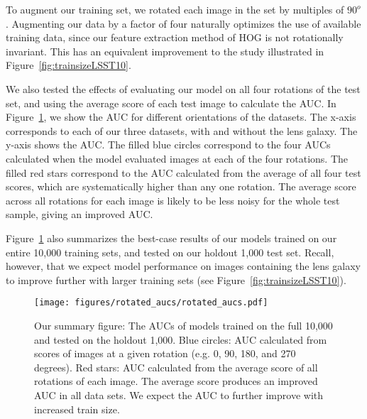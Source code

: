 \documentclass{emulateapj}
\begin{document}
To augment our training set, we rotated each image in the set by
multiples of $90^o$.  Augmenting our data by a factor of four
naturally optimizes the use of available training data, since our
feature extraction method of HOG is not rotationally invariant.  This
has an equivalent improvement to the study illustrated in
Figure~\ref{fig:trainsizeLSST10}.

We also tested the effects of evaluating our model on all four
rotations of the test set, and using the average score of each test
image to calculate the AUC.  In Figure~\ref{fig:rotation_test}, we
show the AUC for different orientations of the datasets.  The x-axis
corresponds to each of our three datasets, with and without the lens
galaxy.  The y-axis shows the AUC.  The filled blue circles correspond
to the four AUCs calculated when the model evaluated images at each of
the four rotations.  The filled red stars correspond to the AUC
calculated from the average of all four test scores, which are
systematically higher than any one rotation.  The average score across
all rotations for each image is likely to be less noisy for the whole
test sample, giving an improved AUC.

Figure~\ref{fig:rotation_test} also summarizes the best-case results
of our models trained on our entire 10,000 training sets, and tested
on our holdout 1,000 test set.  Recall, however, that we expect model
performance on images containing the lens galaxy to improve further
with larger training sets (see Figure~\ref{fig:trainsizeLSST10}).

\begin{figure}[t]
\begin{center}
\texttt{[image: figures/rotated\_aucs/rotated\_aucs.pdf]}
\caption{Our summary figure: The AUCs of models trained on the full
  10,000 and tested on the holdout 1,000.  Blue circles: AUC
  calculated from scores of images at a given rotation (e.g. 0, 90,
  180, and 270 degrees).  Red stars: AUC calculated from the average
  score of all rotations of each image.  The average score produces an
  improved AUC in all data sets.  We expect the AUC to further improve
  with increased train size.}\label{fig:rotation_test}
\end{center}
\end{figure}
\end{document}
